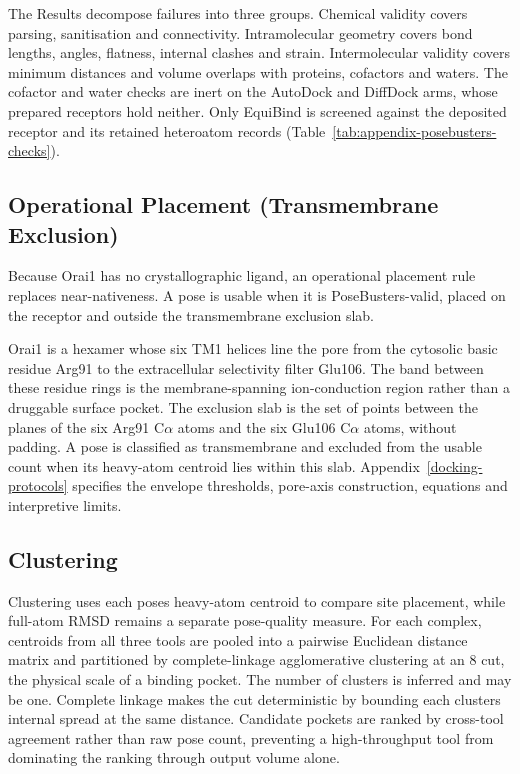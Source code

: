 The Results decompose failures into three groups. Chemical validity covers parsing, sanitisation and connectivity. Intramolecular geometry covers bond lengths, angles, flatness, internal clashes and strain. Intermolecular validity covers minimum distances and volume overlaps with proteins, cofactors and waters. The cofactor and water checks are inert on the AutoDock and DiffDock arms, whose prepared receptors hold neither. Only EquiBind is screened against the deposited receptor and its retained heteroatom records (Table~\ref{tab:appendix-posebusters-checks}).

\hypertarget{operational-placement-transmembrane-exclusion}{%
\subsection{Operational Placement (Transmembrane Exclusion)}\label{operational-placement-transmembrane-exclusion}}

Because Orai1 has no crystallographic ligand, an operational placement rule replaces near-nativeness. A pose is usable when it is PoseBusters-valid, placed on the receptor and outside the transmembrane exclusion slab.

Orai1 is a hexamer whose six TM1 helices line the pore from the cytosolic basic residue Arg91 to the extracellular selectivity filter Glu106. The band between these residue rings is the membrane-spanning ion-conduction region rather than a druggable surface pocket. The exclusion slab is the set of points between the planes of the six Arg91 C\ensuremath{\alpha} atoms and the six Glu106 C\ensuremath{\alpha} atoms, without padding. A pose is classified as transmembrane and excluded from the usable count when its heavy-atom centroid lies within this slab. Appendix~\ref{docking-protocols} specifies the envelope thresholds, pore-axis construction, equations and interpretive limits.

\hypertarget{clustering}{%
\subsection{Clustering}\label{clustering}}

Clustering uses each pose\textquotesingle s heavy-atom centroid to compare site placement, while full-atom RMSD remains a separate pose-quality measure. For each complex, centroids from all three tools are pooled into a pairwise Euclidean distance matrix and partitioned by complete-linkage agglomerative clustering at an 8\angstrom{} cut, the physical scale of a binding pocket. The number of clusters is inferred and may be one. Complete linkage makes the cut deterministic by bounding each cluster\textquotesingle s internal spread at the same distance. Candidate pockets are ranked by cross-tool agreement rather than raw pose count, preventing a high-throughput tool from dominating the ranking through output volume alone.

